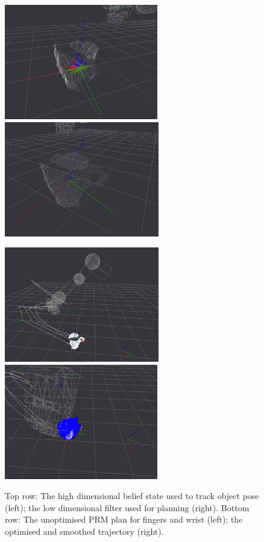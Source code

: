 \begin{figure}[!t]
\centerline{
\includegraphics[height=5.0cm,width=.48\columnwidth]{img/from_rss/high_dim_filter}
\includegraphics[height=5.0cm,width=.48\columnwidth]{img/from_rss/low_dim_filter}
}
\vspace{0.8mm}
\centerline{
\includegraphics[height=5.0cm,width=.48\columnwidth]{img/from_rss/unoptimised_trajectory}
\includegraphics[height=5.0cm,width=.48\columnwidth]{img/from_rss/optimised_trajectory}
}
\caption[IG planner for dexterous grasping]{Top row: The high dimensional belief state used to track object pose (left); the low dimensional filter used for planning (right). Bottom row: The unoptimised PRM plan for fingers and wrist (left); the optimised and smoothed trajectory (right).}
\label{fig:spam.plan.example}
\end{figure}

